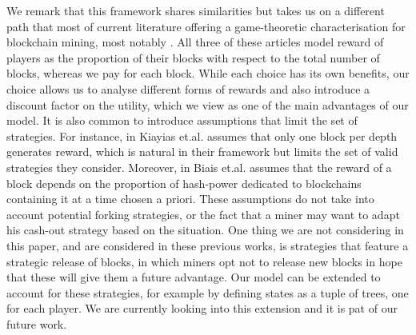 
\smallskip
{} We remark that this framework shares similarities but takes us on a different path that most of current literature offering a game-theoretic characterisation for blockchain mining, most notably \cite{mininggames:2016,biais2018blockchain,koutsoupias2018blockchain}.
All three of these articles model reward of players as the proportion of their blocks with respect to the total number of blocks, whereas we pay for each block. While each choice has its own benefits, our choice allows us to analyse different forms of rewards and also introduce a discount factor on the utility, which we view as one of the main advantages of our model. It is also common to introduce assumptions that limit the set of strategies. For instance, in \cite{mininggames:2016} Kiayias et.al. assumes that only one block per depth generates reward, which is natural in their framework but limits the set of valid strategies they consider. Moreover, in \cite{biais2018blockchain} Biais et.al. assumes that the reward of a block depends on the proportion of hash-power dedicated to blockchains containing it at a time chosen a priori. These assumptions do not take into account potential forking strategies, or the fact that a miner may want to adapt his cash-out strategy based on the situation. 
One thing we are not considering in this paper, and are considered in these previous works, is strategies that feature a strategic release of blocks, in which miners opt not to release new blocks in hope that these will give them a future advantage. Our model can be extended to account for these strategies, for example by defining states as a tuple of trees, one for each player. We are currently looking into this extension and it is pat of our future work. %


